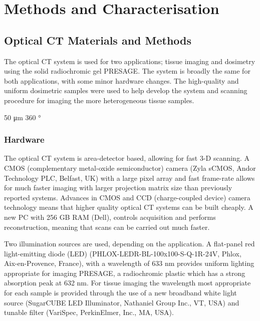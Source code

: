 \chapter{Methods and Characterisation}

\section{Optical CT Materials and Methods}
\label{sec:opticalCTmeth}
The optical CT system is used for two applications; tissue imaging and dosimetry using the solid radiochromic gel PRESAGE. The system is broadly the same for both applications, with some minor hardware changes. The high-quality and uniform dosimetric samples were used to help develop the system and scanning procedure for imaging the more heterogeneous tissue samples.

50 \si{\um} 360 \si{\degree}

\subsection{Hardware}
The  optical CT system is area-detector based, allowing for fast 3-D scanning. A CMOS (complementary metal-oxide semiconductor) camera (Zyla sCMOS, Andor Technology PLC, Belfast, UK) with a large pixel array and fast frame-rate allows for much faster imaging with larger projection matrix size than previously reported systems. Advances in CMOS and CCD (charge-coupled device) camera technology means that higher quality optical CT systems can be built cheaply.  A new PC with 256 GB RAM (Dell), controls acquisition and performs reconstruction, meaning that scans can be carried out much faster. 

Two illumination sources are used, depending on the application. A flat-panel red light-emitting diode (LED) 
(PHLOX-LEDR-BL-100x100-S-Q-1R-24V, Phlox, Aix-en-Provence, France), with a wavelength of 633 nm provides uniform lighting appropriate for imaging PRESAGE\texttrademark , a radiochromic plastic which has a strong absorption peak at 632 nm. 
For tissue imaging the wavelength most appropriate for each sample is provided through the use of a  new broadband white light source (SugarCUBE LED Illuminator, Nathaniel Group Inc., VT, USA) and tunable filter (VariSpec, PerkinElmer, Inc., MA, USA). 



